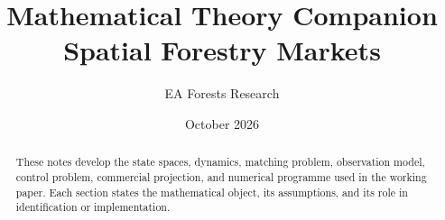 \documentclass[11pt]{article}
\title{Mathematical Theory Companion\\\large Spatial Forestry Markets}
\author{EA Forests Research}
\date{October 2026}
\begin{document}
\maketitle

\begin{abstract}
These notes develop the state spaces, dynamics, matching problem, observation
model, control problem, commercial projection, and numerical programme used in
the working paper. Each section states the mathematical object, its assumptions,
and its role in identification or implementation.
\end{abstract}

\tableofcontents
\clearpage













\end{document}

